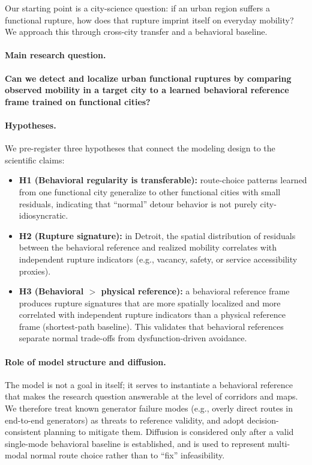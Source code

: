 Our starting point is a city-science question: if an urban region suffers a functional rupture, how does that rupture imprint itself on everyday mobility? We approach this through cross-city transfer and a behavioral baseline.

\paragraph{Main research question.}
\textbf{Can we detect and localize urban functional ruptures by comparing observed mobility in a target city to a learned behavioral reference frame trained on functional cities?}

\paragraph{Hypotheses.}
We pre-register three hypotheses that connect the modeling design to the scientific claims:
\begin{itemize}
  \item \textbf{H1 (Behavioral regularity is transferable):} route-choice patterns learned from one functional city generalize to other functional cities with small residuals, indicating that ``normal'' detour behavior is not purely city-idiosyncratic.
  \item \textbf{H2 (Rupture signature):} in Detroit, the spatial distribution of residuals between the behavioral reference and realized mobility correlates with independent rupture indicators (e.g., vacancy, safety, or service accessibility proxies).
  \item \textbf{H3 (Behavioral $>$ physical reference):} a behavioral reference frame produces rupture signatures that are more spatially localized and more correlated with independent rupture indicators than a physical reference frame (shortest-path baseline). This validates that behavioral references separate normal trade-offs from dysfunction-driven avoidance.
\end{itemize}

\paragraph{Role of model structure and diffusion.}
The model is not a goal in itself; it serves to instantiate a behavioral reference that makes the research question answerable at the level of corridors and maps. We therefore treat known generator failure modes (e.g., overly direct routes in end-to-end generators) as threats to reference validity, and adopt decision-consistent planning to mitigate them. Diffusion is considered only after a valid single-mode behavioral baseline is established, and is used to represent multi-modal normal route choice rather than to ``fix'' infeasibility.
